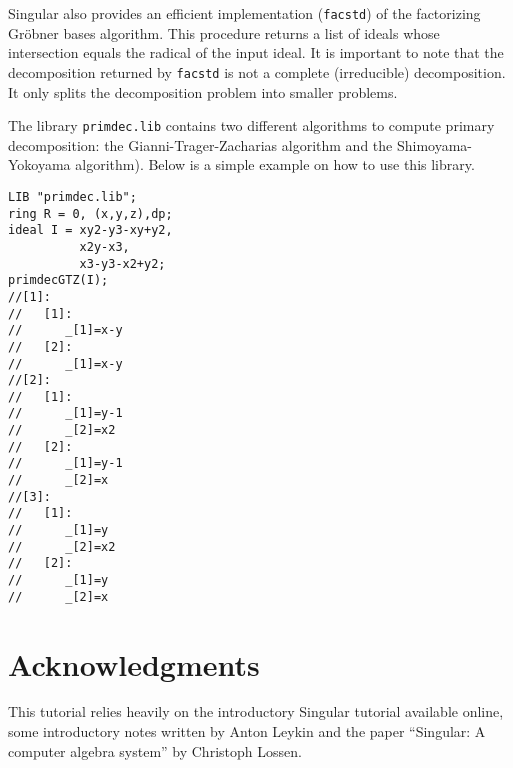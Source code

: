 \documentclass[12pt]{amsart}
\begin{document}
Singular also provides an efficient implementation (\texttt{facstd}) of the factorizing Gr\"obner bases algorithm.   
This procedure returns a list of ideals whose intersection equals the radical of the input ideal. It is
important to note that the decomposition returned by \texttt{facstd} is not a complete (irreducible) decomposition.
It only splits the decomposition problem into smaller problems.

The library \texttt{primdec.lib} contains two different algorithms to compute primary decomposition: the
Gianni-Trager-Zacharias algorithm and the Shimoyama-Yokoyama algorithm). Below is a simple example on how
to use this library.

\begin{verbatim}
LIB "primdec.lib";
ring R = 0, (x,y,z),dp;
ideal I = xy2-y3-xy+y2,
          x2y-x3,
          x3-y3-x2+y2;
primdecGTZ(I);
//[1]:
//   [1]:
//      _[1]=x-y
//   [2]:
//      _[1]=x-y
//[2]:
//   [1]:
//      _[1]=y-1
//      _[2]=x2
//   [2]:
//      _[1]=y-1
//      _[2]=x
//[3]:
//   [1]:
//      _[1]=y
//      _[2]=x2
//   [2]:
//      _[1]=y
//      _[2]=x
\end{verbatim}  

\section*{Acknowledgments}

This tutorial relies heavily on the introductory Singular tutorial available online, 
some introductory notes written by Anton Leykin and the paper ``Singular: A computer
algebra system'' by Christoph Lossen. 
\end{document}
